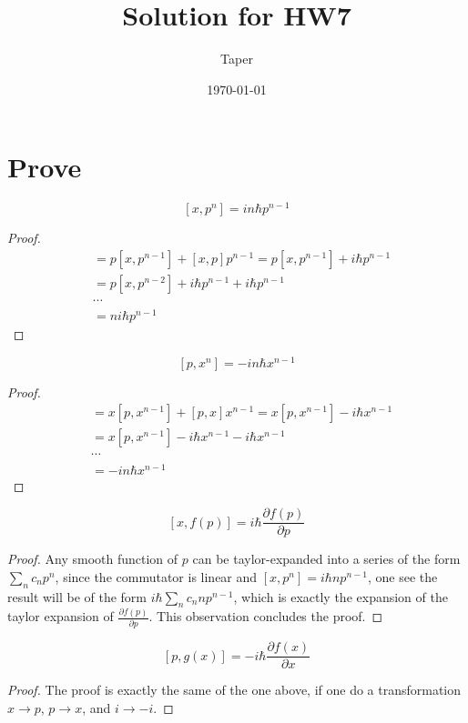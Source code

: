 \documentclass{article}
\title{Solution for HW7}
\date{\today}
\author{Taper}
\begin{document}
\maketitle
{}
\section{Prove}
\label{sec:Prove}
$$  [x,p^n] = in\hbar p^{n-1} $$

\begin{proof}
    \begin{align*}
        [x,p^n] &= p[x,p^{n-1}] + [x,p]p^{n-1} 
            = p[x,p^{n-1}]+i\hbar p^{n-1} \\
        &= p[x,p^{n-2}]+ i\hbar p^{n-1} + i\hbar p^{n-1} \\
        &\cdots \\
        &= ni\hbar p^{n-1}
    \end{align*}
\end{proof}
$$ [p,x^n] = -in\hbar x^{n-1} $$
\begin{proof}
\begin{align*}
    [p,x^n] &= x[p,x^{n-1}] + [p,x]x^{n-1} = x[p,x^{n-1}]  -i\hbar x^{n-1}
    \\
    &= x[p,x^{n-1}] -i\hbar x^{n-1} - i\hbar x^{n-1} \\
    &\cdots \\
    &= -in\hbar x^{n-1}
\end{align*}
\end{proof}

$$ [x,f(p)] = i\hbar \frac{\partial f(p)}{\partial p} $$
\begin{proof}
    Any smooth function of $p$ can be taylor-expanded into a series of
    the form $\sum_n c_n p^n$, since the commutator is linear and 
    $[x,p^n]=i\hbar np^{n-1}$, one see the result will be of the form
    $i\hbar \sum_n c_{n} n p^{n-1}$, which is exactly the expansion of
    the taylor expansion of $\frac{\partial f(p)}{\partial p}$. This
    observation concludes the proof.
\end{proof}

$$ [p,g(x)] = -i\hbar \frac{\partial f(x)}{\partial x} $$

\begin{proof}
    The proof is exactly the same of the one above, if one do a
    transformation $x\to p$, $p\to x$, and $i\to -i$.
\end{proof}
\end{document}
